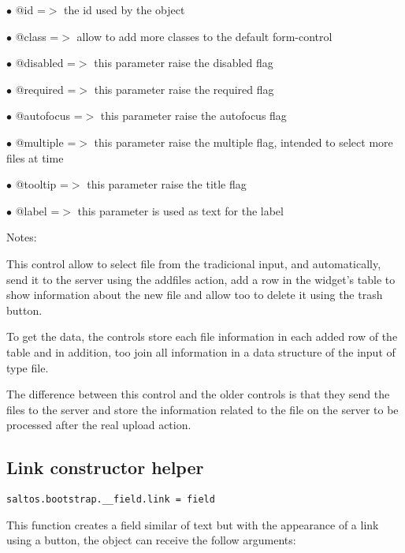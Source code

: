 \documentclass[a4paper]{book}
\begin{document}
\begin{compactitem}
\item[\color{myblue}$\bullet$] @id       =$>$ the id used by the object
\item[\color{myblue}$\bullet$] @class    =$>$ allow to add more classes to the default form-control
\item[\color{myblue}$\bullet$] @disabled =$>$ this parameter raise the disabled flag
\item[\color{myblue}$\bullet$] @required =$>$ this parameter raise the required flag
\item[\color{myblue}$\bullet$] @autofocus   =$>$ this parameter raise the autofocus flag
\item[\color{myblue}$\bullet$] @multiple =$>$ this parameter raise the multiple flag, intended to select more files at time
\item[\color{myblue}$\bullet$] @tooltip  =$>$ this parameter raise the title flag
\item[\color{myblue}$\bullet$] @label    =$>$ this parameter is used as text for the label
\end{compactitem}

Notes:

This control allow to select file from the tradicional input, and automatically, send it
to the server using the addfiles action, add a row in the widget's table to show information
about the new file and allow too to delete it using the trash button.

To get the data, the controls store each file information in each added row of the table and
in addition, too join all information in a data structure of the input of type file.

The difference between this control and the older controls is that they send the files to
the server and store the information related to the file on the server to be processed after
the real upload action.

\hypertarget{toc454}{}
\subsection{Link constructor helper}

\begin{lstlisting}
saltos.bootstrap.__field.link = field
\end{lstlisting}

This function creates a field similar of text but with the appearance of a link using a button,
the object can receive the follow arguments:
\end{document}
